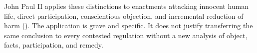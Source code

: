 John Paul II applies these distinctions to enactments attacking innocent human life, direct participation, conscientious objection, and incremental reduction of harm (). The application is grave and specific. It does not justify transferring the same conclusion to every contested regulation without a new analysis of object, facts, participation, and remedy.
